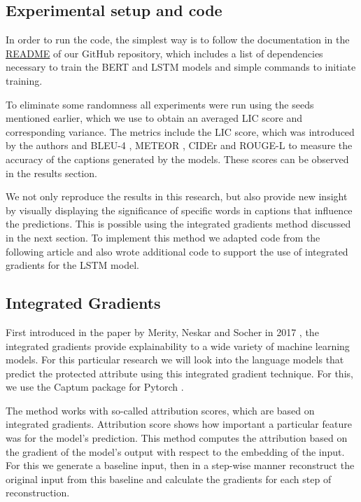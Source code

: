\subsection{Experimental setup and code}

In order to run the code, the simplest way is to follow the documentation in the \href{https://github.com/martentyrk/mlrc2022hirota/blob/main/README.md}{README} of our GitHub repository, which includes a list of dependencies necessary to train the 
BERT and LSTM models and simple commands to initiate training.\newline

To eliminate some randomness all experiments were run using the seeds mentioned earlier, which we use to obtain an averaged LIC score and corresponding variance. The metrics include the LIC 
score, which was introduced by the authors and BLEU-4 \cite{bleu:2002}, METEOR 
\cite{meteor:2014}, CIDEr \cite{cider:2014} and ROUGE-L \cite{rouge:2004} to measure the accuracy of the captions generated by the models. These scores can be observed in the results section. \newline

We not only reproduce the results in this research, but also provide new insight by visually displaying the significance of specific words in captions that influence the predictions. This is possible using the integrated gradients method discussed in the next section. To implement this method we adapted code from the following article \cite{winastwan:2023} and also wrote additional code to support the use of integrated gradients for the LSTM model.


\subsection{Integrated Gradients}
First introduced in the paper by Merity, Neskar and Socher in 2017 \cite{merity2017regularizing},
the integrated gradients provide explainability to a wide variety of machine learning models. For this particular research we will look into the language models that predict the protected attribute using this integrated gradient technique. For this, we use the Captum package for Pytorch \cite{NEURIPS20199015}. 
\newline

The method works with so-called attribution scores, which are based on integrated gradients. Attribution score shows how important a particular feature was for the model’s prediction.
This method computes the attribution based on the gradient of the 
model's output with respect to the embedding of the input. For this we generate a baseline input, then in a step-wise manner reconstruct the original input from this baseline and calculate the gradients for each step of reconstruction.
\newline

